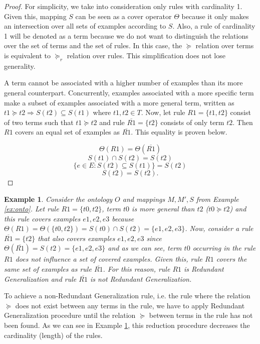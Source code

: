 \documentclass{bmcart}
\newtheorem{example}{Example}
\begin{document}
\begin{proof}

For simplicity, we take into consideration only rules with cardinality 1. Given this, mapping $S$ can be seen as a cover operator $\Theta$ because it only makes an intersection over all sets of examples according to $S$. Also, a rule of cardinality 1 will be denoted as a term because we do not want to distinguish the relations over the set of terms and the set of rules. In this case, the $\succeq$ relation over terms is equivalent to $\succeq_{r}$ relation over rules. This simplification does not lose generality.

A term cannot be associated with a higher number of examples than its more general counterpart. Concurrently, examples associated with a more specific term make a subset of examples associated with a more general term, written as $t1 \succeq t2 \Rightarrow S(t2) \subseteq S(t1)$ where $t1,t2 \in T$.
Now, let rule $R1=\{t1,t2\}$ consist of two terms such that $t1 \succeq t2$ and rule $\overline{R1} = \{t2\}$ consists of only term $t2$. Then $R1$ covers an equal set of examples as $\overline{R1}$. This equality is proven below.

$$ \Theta(R1) = \Theta(\overline{R1})$$
$$S(t1) \cap S(t2) = S(t2)$$
$$\{e \in E: S(t2) \subseteq S(t1)\} = S(t2)$$
$$S(t2) = S(t2).$$
\end{proof}

\begin{example} \label{ex:6}
Consider the ontology $O$ and mappings $M,M',S$ from Example \ref{ex:onto}. Let rule $R1=\{t0,t2\}$, term $t0$ is more general than $t2$ ($t0 \succeq t2$) and this rule covers examples $e1, e2, e3$ because $\Theta(R1) = \Theta(\{t0,t2\}) = S(t0) \cap S(t2) = \{e1, e2, e3\}$. Now, consider a rule $\overline{R1} = \{t2\}$ that also covers examples $e1,e2,e3$ since $\Theta(\overline{R1}) = S(t2) = \{e1, e2, e3\}$ and as we can see, term $t0$ occurring in the rule $R1$ does not influence a set of covered examples. Given this, rule $R1$ covers the same set of examples as rule $\overline{R1}$. For this reason, rule $R1$ is Redundant Generalization and rule $\overline{R1}$ is not Redundant Generalization.
\end{example}


To achieve a non-Redundant Generalization rule, i.e. the rule where the relation $\succeq$ does not exist between any terms in the rule, we have to apply Redundant Generalization procedure until the relation $\succeq$  between terms in the rule has not been found.
As we can see in Example \ref{ex:6}, this reduction procedure decreases the cardinality (length) of the rules. 
\end{document}

